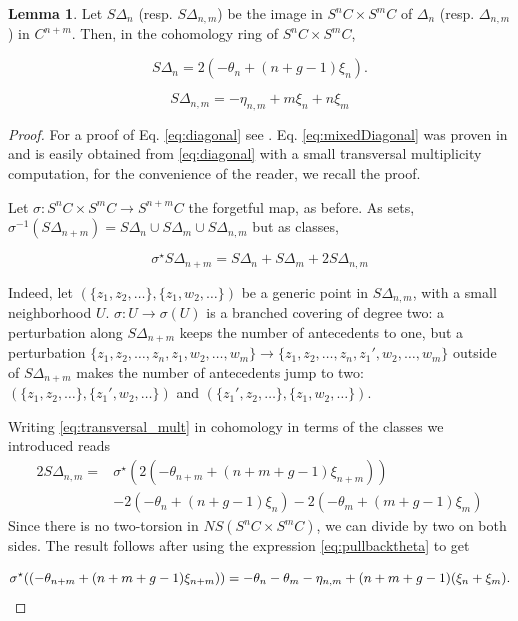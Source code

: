 \documentclass{article}
\theoremstyle{definition}
\newcounter{sharedcounter}[section]
\newtheorem{lemma}[sharedcounter]{Lemma}
\newcommand{\eq}[2][1]{
\begin{equation*}
	\addtolength{\fboxsep}{0pt}
	\begin{alignedat}{#1}
	#2
	\end{alignedat}
\end{equation*}
}
\begin{document}
\begin{lemma}
\label{lem:expincohomologyofbigdiag}
Let $S\Delta_n$ (resp. $S\Delta_{n,m}$) be the image in $S^n C\times S^mC$ of $\Delta_n$ (resp. $\Delta_{n,m}$) in $C^{n+m}$. Then, in the cohomology ring of $S^n C\times S^m C$, 

\begin{equation}
\label{eq:diagonal}
S\Delta_{n}=2(-\theta_n+(n+g-1) \xi_n). 
\end{equation}

\begin{equation}
    \label{eq:mixedDiagonal}
S\Delta_{n,m}=-\eta_{n,m}+m\xi_n+n\xi_m
\end{equation}

\end{lemma}

\begin{proof} 
For a proof of Eq. \eqref{eq:diagonal} see \cite{Griffiths_book}. Eq. \eqref{eq:mixedDiagonal} was proven in \cite{Aldonza_Dupont_2025} and is easily obtained from \eqref{eq:diagonal} with a small transversal multiplicity computation, for the convenience of the reader, we recall the proof.
    
Let $\sigma: S^{n}C \times S^{m}C\rightarrow S^{n+m}C$ the forgetful map, as before. As sets, $\sigma^{-1} \left( S\Delta_{n+m}\right)=S\Delta_n \cup S\Delta_m \cup S\Delta_{n,m}$ but as classes, 
    
    \begin{equation}
    \label{eq:transversal_mult}
    \sigma^\star S\Delta_{n+m}=S\Delta_n+S\Delta_m+2S\Delta_{n,m}
    \end{equation}
   
Indeed, let $(\{z_1, z_2, \dots\},\{z_1, w_2, \dots\})$ be a generic point in $S\Delta_{n,m}$, with  a small neighborhood $U$. $\sigma:U\to \sigma(U) $ is a branched covering of degree two: a perturbation along $S\Delta_{n+m}$ keeps the number of antecedents to one, but a perturbation $\{z_1, z_2, \dots,z_{n},z_1,w_2,\dots,w_{m}\} \to \{z_1, z_2, \dots,z_{n},z_1',w_2,\dots,w_{m}\}$ outside of $S\Delta_{n+m}$ makes the number of antecedents jump to two: $(\{z_1, z_2, \dots\},\{z_1', w_2, \dots\})$ and $(\{z_1', z_2, \dots\},\{z_1, w_2, \dots\})$.


   Writing \eqref{eq:transversal_mult} in cohomology in terms of the classes we introduced reads 
   \begin{align*}
   2 S\Delta_{n,m}= &\sigma^\star ( 2(-\theta_{n+m}+(n+m+g-1) \xi_{n+m}))\\& - 2(-\theta_n+(n+g-1) \xi_n) - 2(-\theta_m+(m+g-1) \xi_m)
   \end{align*}
   Since there is no two-torsion in $NS(S^n C \times S^m C)$, we can divide by two on both sides. 
   The result follows after using the expression \eqref{eq:pullbacktheta} to get 
   \eq{
    \sigma^\star ((-\theta_{n+m}+(n+m+g-1) \xi_{n+m}))=-\theta_n-\theta_m-\eta_{n,m}+(n+m+g-1)(\xi_n+\xi_m).
   }
   

\end{proof}
\end{document}
